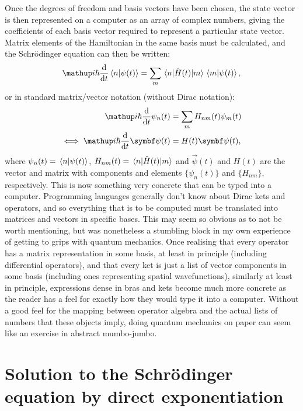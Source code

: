 Once the degrees of freedom and basis vectors have been chosen, the state vector is then represented on a computer as an array of complex numbers, giving the coefficients of each basis vector required to represent a particular state vector. Matrix elements of the Hamiltonian in the same basis must be calculated, and the Schr\"odinger equation can then be written:
\begin{align}
\ii\hbar\dv{t}\braket n{\psi(t)} = \sum_m\matrixel n {\hat H(t)} m \braket m {\psi(t)},
\end{align}
or in standard matrix/vector notation (without Dirac notation):
\begin{align}\label{eq:schrodinger_equation_matrix_vector}
\ii\hbar\dv{t}\psi_n(t) &= \sum_m H_{nm}(t) \psi_m(t)\\
\iff \ii\hbar\dv{t} \vec \psi(t) &= H(t) \vec \psi(t),
\end{align}
where $\psi_n(t) = \braket n{\psi(t)}$, $H_{nm}(t) = \matrixel n {\hat H(t)} m$ and $\vec \psi(t)$ and $H(t)$ are the vector and matrix with components and elements $\{\psi_n(t)\}$ and $\{H_{nm}\}$, respectively.
This is now something very concrete that can be typed into a computer. Programming languages generally don't know about Dirac kets and operators, and so everything that is to be computed must be translated into matrices and vectors in specific bases. This may seem so obvious as to not be worth mentioning, but was nonetheless a stumbling block in my own experience of getting to grips with quantum mechanics. Once realising that every operator has a matrix representation in some basis, at least in principle (including differential operators), and that every ket is just a list of vector components in some basis (including ones representing spatial wavefunctions), similarly at least in principle, expressions dense in bras and kets become much more concrete as the reader has a feel for exactly how they would type it into a computer. Without a good feel for the mapping between operator algebra and the actual lists of numbers that these objects imply, doing quantum mechanics on paper can seem like an exercise in abstract mumbo-jumbo.

\section{Solution to the Schr\"odinger equation by direct exponentiation}

